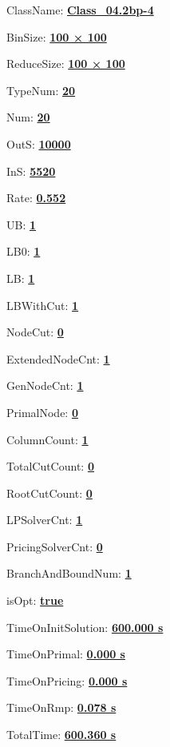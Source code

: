 \documentclass[11pt]{article}
\begin{document}
\pagestyle{empty}


ClassName: \underline{\textbf{Class_04.2bp-4}}
\par
BinSize: \underline{\textbf{100 × 100}}
\par
ReduceSize: \underline{\textbf{100 × 100}}
\par
TypeNum: \underline{\textbf{20}}
\par
Num: \underline{\textbf{20}}
\par
OutS: \underline{\textbf{10000}}
\par
InS: \underline{\textbf{5520}}
\par
Rate: \underline{\textbf{0.552}}
\par
UB: \underline{\textbf{1}}
\par
LB0: \underline{\textbf{1}}
\par
LB: \underline{\textbf{1}}
\par
LBWithCut: \underline{\textbf{1}}
\par
NodeCut: \underline{\textbf{0}}
\par
ExtendedNodeCnt: \underline{\textbf{1}}
\par
GenNodeCnt: \underline{\textbf{1}}
\par
PrimalNode: \underline{\textbf{0}}
\par
ColumnCount: \underline{\textbf{1}}
\par
TotalCutCount: \underline{\textbf{0}}
\par
RootCutCount: \underline{\textbf{0}}
\par
LPSolverCnt: \underline{\textbf{1}}
\par
PricingSolverCnt: \underline{\textbf{0}}
\par
BranchAndBoundNum: \underline{\textbf{1}}
\par
isOpt: \underline{\textbf{true}}
\par
TimeOnInitSolution: \underline{\textbf{600.000 s}}
\par
TimeOnPrimal: \underline{\textbf{0.000 s}}
\par
TimeOnPricing: \underline{\textbf{0.000 s}}
\par
TimeOnRmp: \underline{\textbf{0.078 s}}
\par
TotalTime: \underline{\textbf{600.360 s}}
\par
\newpage
\end{document}

